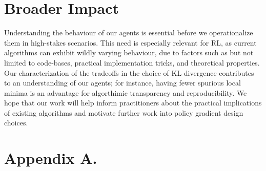 \documentclass[twoside,11pt]{article}
\begin{document}
\section*{Broader Impact}
Understanding the behaviour of our agents is essential before we operationalize them in high-stakes scenarios. This need is especially relevant for RL, as current algorithms can exhibit wildly varying behaviour, due to factors such as but not limited to code-bases, practical implementation tricks, and theoretical properties. Our characterization of the tradeoffs in the choice of KL divergence contributes to an understanding of our agents; for instance, having fewer spurious local minima is an advantage for algorthimic transparency and reproducibility. We hope that our work will help inform practitioners about the practical implications of existing algorithms and motivate further work into policy gradient design choices. 





\newpage

\appendix
\section*{Appendix A.}
\label{app:theorem}






\vskip 0.2in

\end{document}
